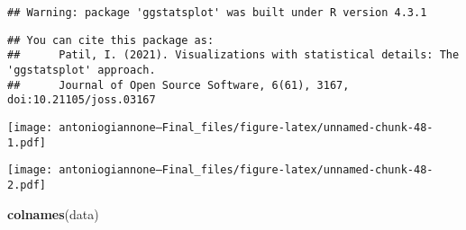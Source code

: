 \documentclass[
]{article}
\newenvironment{Shaded}{\begin{snugshade}}{\end{snugshade}}
\newcommand{\AttributeTok}[1]{\textcolor[rgb]{0.13,0.29,0.53}{#1}}
\newcommand{\CommentTok}[1]{\textcolor[rgb]{0.56,0.35,0.01}{\textit{#1}}}
\newcommand{\ConstantTok}[1]{\textcolor[rgb]{0.56,0.35,0.01}{#1}}
\newcommand{\FunctionTok}[1]{\textcolor[rgb]{0.13,0.29,0.53}{\textbf{#1}}}
\newcommand{\NormalTok}[1]{#1}
\newcommand{\StringTok}[1]{\textcolor[rgb]{0.31,0.60,0.02}{#1}}
\begin{document}
\begin{verbatim}
## Warning: package 'ggstatsplot' was built under R version 4.3.1
\end{verbatim}

\begin{verbatim}
## You can cite this package as:
##      Patil, I. (2021). Visualizations with statistical details: The 'ggstatsplot' approach.
##      Journal of Open Source Software, 6(61), 3167, doi:10.21105/joss.03167
\end{verbatim}

\begin{Shaded}
\end{Shaded}

\texttt{[image: antoniogiannone---Final\_files/figure-latex/unnamed-chunk-48-1.pdf]}

\begin{Shaded}
\end{Shaded}

\texttt{[image: antoniogiannone---Final\_files/figure-latex/unnamed-chunk-48-2.pdf]}

\begin{Shaded}
\begin{Highlighting}[]
\FunctionTok{colnames}\NormalTok{(data)}
\end{Highlighting}
\end{Shaded}
\end{document}
